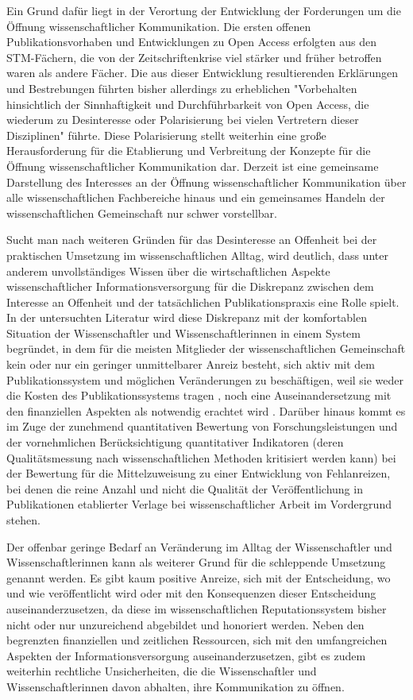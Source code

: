 Ein Grund dafür liegt in der Verortung der Entwicklung der Forderungen um die Öffnung wissenschaftlicher Kommunikation. Die ersten offenen Publikationsvorhaben und Entwicklungen zu Open Access erfolgten aus den STM-Fächern, die von der Zeitschriftenkrise viel stärker und früher betroffen waren als andere Fächer. Die aus dieser Entwicklung resultierenden Erklärungen und Bestrebungen führten bisher allerdings zu erheblichen "Vorbehalten hinsichtlich der Sinnhaftigkeit und Durchführbarkeit von Open Access, die wiederum zu Desinteresse oder Polarisierung bei vielen Vertretern dieser Disziplinen" \cite{Naeder_2010} führte. Diese Polarisierung stellt weiterhin eine große Herausforderung für die Etablierung und Verbreitung der Konzepte für die Öffnung wissenschaftlicher Kommunikation dar. Derzeit ist eine gemeinsame Darstellung des Interesses an der Öffnung wissenschaftlicher Kommunikation über alle wissenschaftlichen Fachbereiche hinaus und ein gemeinsames Handeln der wissenschaftlichen Gemeinschaft nur schwer vorstellbar.

Sucht man nach weiteren Gründen für das Desinteresse an Offenheit bei der praktischen Umsetzung im wissenschaftlichen Alltag, wird deutlich, dass unter anderem unvollständiges Wissen über die wirtschaftlichen Aspekte wissenschaftlicher Informationsversorgung für die Diskrepanz zwischen dem Interesse an Offenheit und der tatsächlichen Publikationspraxis eine Rolle spielt. In der untersuchten Literatur wird diese Diskrepanz mit der komfortablen Situation der Wissenschaftler und Wissenschaftlerinnen in einem System begründet, in dem für die meisten Mitglieder der wissenschaftlichen Gemeinschaft kein oder nur ein geringer unmittelbarer Anreiz besteht, sich aktiv mit dem Publikationssystem und möglichen Veränderungen zu beschäftigen, weil sie weder die Kosten des Publikationssystems tragen \cite{Sietmann_2007}, noch eine Auseinandersetzung mit den finanziellen Aspekten als notwendig erachtet wird \cite{Herb_2010}. Darüber hinaus kommt es im Zuge der zunehmend quantitativen Bewertung von Forschungsleistungen und der vornehmlichen Berücksichtigung quantitativer Indikatoren (deren Qualitätsmessung nach wissenschaftlichen Methoden kritisiert werden kann) bei der Bewertung für die Mittelzuweisung zu einer Entwicklung von Fehlanreizen, bei denen die reine Anzahl und nicht die Qualität der Veröffentlichung in Publikationen etablierter Verlage bei wissenschaftlicher Arbeit im Vordergrund stehen.

Der offenbar geringe Bedarf an Veränderung im Alltag der Wissenschaftler und Wissenschaftlerinnen kann als weiterer Grund für die schleppende Umsetzung genannt werden. Es gibt kaum positive Anreize, sich mit der Entscheidung, wo und wie veröffentlicht wird oder mit den Konsequenzen dieser Entscheidung auseinanderzusetzen, da diese im wissenschaftlichen Reputationssystem bisher nicht oder nur unzureichend abgebildet und honoriert werden. Neben den begrenzten finanziellen und zeitlichen Ressourcen, sich mit den umfangreichen Aspekten der Informationsversorgung auseinanderzusetzen, gibt es zudem weiterhin rechtliche Unsicherheiten, die die Wissenschaftler und Wissenschaftlerinnen davon abhalten, ihre Kommunikation zu öffnen.

